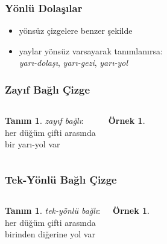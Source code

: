 \documentclass[dvipsnames]{beamer}
\theoremstyle{definition}
\newtheorem{tanim}[theorem]{Tanım}
\theoremstyle{example}
\newtheorem{ornek}[theorem]{Örnek}
\theoremstyle{plain}
\begin{document}
\begin{frame}
  \frametitle{Yönlü Dolaşılar}

  \begin{itemize}
    \item yönsüz çizgelere benzer şekilde

    \pause
    \item yaylar yönsüz varsayarak tanımlanırsa:\\
      \emph{yarı-dolaşı}, \emph{yarı-gezi}, \emph{yarı-yol}
  \end{itemize}
\end{frame}

\begin{frame}
  \frametitle{Zayıf Bağlı Çizge}

  \begin{columns}
    \begin{tanim}
      \emph{zayıf bağlı}:\\
      her düğüm çifti arasında\\
      bir yarı-yol var
    \end{tanim}

    \begin{ornek}
      \begin{center}
      \end{center}
    \end{ornek}
  \end{columns}
\end{frame}

\begin{frame}
  \frametitle{Tek-Yönlü Bağlı Çizge}

  \begin{columns}
    \begin{tanim}
      \emph{tek-yönlü bağlı}:\\
      her düğüm çifti arasında\\
      birinden diğerine yol var
    \end{tanim}

    \begin{ornek}
      \begin{center}
      \end{center}
    \end{ornek}
  \end{columns}
\end{frame}
\end{document}
